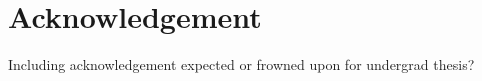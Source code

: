 %
\chapter*{Acknowledgement}
\label{sec:acknowledgement}
\vspace*{-10mm}

Including acknowledgement expected or frowned upon for undergrad thesis?
